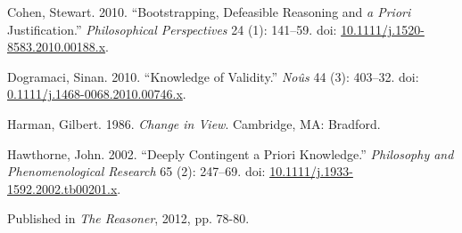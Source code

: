 \documentclass[
  11pt,
  letterpaper,
  DIV=11,
  numbers=noendperiod,
  twoside]{scrartcl}
\newlength{\cslhangindent}
\newenvironment{CSLReferences}[2] %
 {\begin{list}{}{%
  \setlength{\itemindent}{0pt}
  \setlength{\leftmargin}{0pt}
  \setlength{\parsep}{0pt}
  \ifodd #1
   \setlength{\leftmargin}{\cslhangindent}
   \setlength{\itemindent}{-1\cslhangindent}
  \fi
  \setlength{\itemsep}{#2\baselineskip}}}
 {\end{list}}
\begin{document}
\protect{}\label{refs}
\begin{CSLReferences}{1}{0}
Cohen, Stewart. 2010. {``Bootstrapping, Defeasible Reasoning and \emph{a
Priori} Justification.''} \emph{Philosophical Perspectives} 24 (1):
141--59. doi:
\href{https://doi.org/10.1111/j.1520-8583.2010.00188.x}{10.1111/j.1520-8583.2010.00188.x}.

Dogramaci, Sinan. 2010. {``Knowledge of Validity.''} \emph{No{û}s} 44
(3): 403--32. doi:
\href{https://doi.org/0.1111/j.1468-0068.2010.00746.x}{0.1111/j.1468-0068.2010.00746.x}.

Harman, Gilbert. 1986. \emph{Change in View}. Cambridge, MA: Bradford.

Hawthorne, John. 2002. {``Deeply Contingent a Priori Knowledge.''}
\emph{Philosophy and Phenomenological Research} 65 (2): 247--69. doi:
\href{https://doi.org/10.1111/j.1933-1592.2002.tb00201.x}{10.1111/j.1933-1592.2002.tb00201.x}.

\end{CSLReferences}



\noindent Published in\emph{
The Reasoner}, 2012, pp. 78-80.
\end{document}
